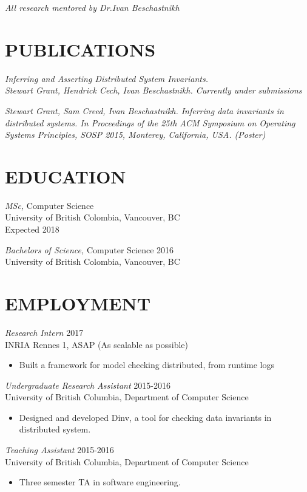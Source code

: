 \documentclass[line,margin]{res}
\begin{document}
\begin{resume}
{\sl \textit{All research mentored by Dr.Ivan Beschastnikh}}\\

\section{PUBLICATIONS}

{\sl 
    Inferring and Asserting Distributed System Invariants. \\
    Stewart Grant, Hendrick Cech, Ivan Beschastnikh. 
    \it{Currently under submissions}}

{\sl Stewart Grant, Sam Creed, Ivan Beschastnikh. Inferring data invariants in distributed systems. In \it{Proceedings of the 25th ACM Symposium on Operating Systems Principles, SOSP 2015}, Monterey, California, USA. (Poster)}

\section{EDUCATION}
{\sl MSc,} Computer Science\\
University of British Colombia, Vancouver, BC \\
Expected 2018

{\sl Bachelors of Science,} Computer Science	\hfill 2016\\
University of British Colombia, Vancouver, BC \\


\section{EMPLOYMENT} 
{\sl Research Intern} \hfill 2017\\
    INRIA Rennes 1, ASAP (As scalable as possible)
\begin{itemize} \itemsep -2pt
        \item Built a framework for model checking distributed, from runtime logs
    \end{itemize}
{\sl Undergraduate Research Assistant} \hfill 2015-2016\\
	University of British Columbia, Department of Computer Science
\begin{itemize} \itemsep -2pt
        \item Designed and developed Dinv, a tool for checking data invariants in distributed system.
    \end{itemize}
{\sl Teaching Assistant} \hfill 2015-2016\\
	University of British Columbia, Department of Computer Science
\begin{itemize} \itemsep -2pt
		\item Three semester TA in software engineering.
	\end{itemize}


\end{resume}
\end{document}
